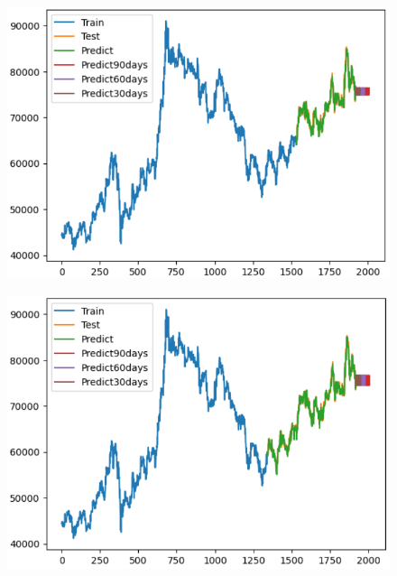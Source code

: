 \documentclass[conference]{IEEEtran}
\begin{document}
\begin{figure}[H]
    \centering
    \begin{minipage}{0.15\textwidth}
    \centering
    \includegraphics[width=1\textwidth]{Image/XGBoost/XGBoost_SAMSUNG_6_4.png}
   
    \label{fig:1}
    \end{minipage}%
    \begin{minipage}{0.15\textwidth}
    \centering
    \includegraphics[width=1\textwidth]{Image/XGBoost/XGBoost_SAMSUNG_7_3.png}
  

\end{minipage}
\end{figure}
\end{document}
